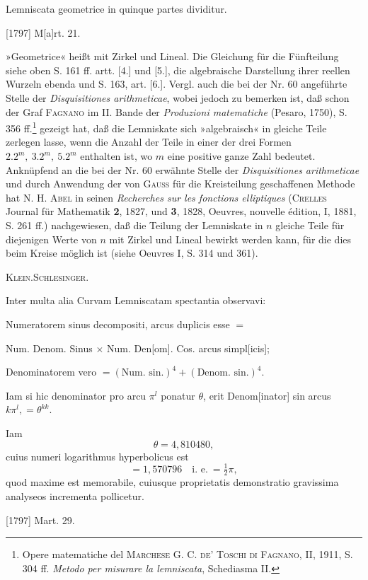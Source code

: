 \clearpage{}
\indent Lemniscata geometrice in quinque partes dividitur.
\par\noindent\hfill[1797] M[a]rt. 21.

\medskip\begingroup\small
\indent »Geometrice« heißt mit Zirkel und Lineal. Die Gleichung für die Fünfteilung siehe oben S. 161 ff. artt. [4.] und [5.], die algebraische Darstellung ihrer reellen Wurzeln ebenda und S. 163, art. [6.]. Vergl. auch die bei der Nr. 60 angeführte Stelle der \textit{Disquisitiones arithmeticae}, wobei jedoch zu bemerken ist, daß schon der Graf \textsc{Fagnano} im II. Bande der \textit{Produzioni matematiche} (Pesaro, 1750), S. 356 ff.\footnote{Opere matematiche del \textsc{Marchese G. C. de’ Toschi di Fagnano}, II, 1911, S. 304 ff. \textit{Metodo per misurare la lemniscata}, Schediasma II.} gezeigt hat, daß die Lemniskate sich »algebraisch« in gleiche Teile zerlegen lasse, wenn die Anzahl der Teile in einer der drei Formen \(2.2^m,\ 3.2^m,\ 5.2^m\) enthalten ist, wo \(m\) eine positive ganze Zahl bedeutet. Anknüpfend an die bei der Nr. 60 erwähnte Stelle der \textit{Disquisitiones arithmeticae} und durch Anwendung der von \textsc{Gauss} für die Kreisteilung geschaffenen Methode hat N. H. \textsc{Abel} in seinen \textit{Recherches sur les fonctions elliptiques} (\textsc{Crelles} Journal für Mathematik \textbf{2}, 1827, und \textbf{3}, 1828, Oeuvres, nouvelle édition, I, 1881, S. 261 ff.) nachgewiesen, daß die Teilung der Lemniskate in \(n\) gleiche Teile für diejenigen Werte von \(n\) mit Zirkel und Lineal bewirkt werden kann, für die dies beim Kreise möglich ist (siehe Oeuvres I, S. 314 und 361).
\par\noindent\hfill\textsc{Klein.\quad Schlesinger.}
\par\endgroup

\indent Inter multa alia Curvam Lemniscatam spectantia observavi:
\par\indent [1)] Numeratorem sinus decompositi, arcus duplicis esse \(=\)
\par{} Num. Denom. Sinus \(\times\) Num. Den[om]. Cos. arcus simpl[icis];
\par\indent [2)] Denominatorem vero \(=(\text{Num. sin.})^4+(\text{Denom. sin.})^4\).
\par\indent [3)] Iam si hic denominator pro arcu \(\pi^l\) ponatur \(\theta\), erit Denom[inator] sin arcus \(k\pi^l,=\theta^{kk}\).
\par\indent [4)] Iam
\[
\theta=4{,}810480,
\]
\indent [5)] cuius numeri logarithmus hyperbolicus est
\[
=1{,}570796\quad\text{i. e.}\ =\tfrac12\pi,
\]
\noindent quod maxime est memorabile, cuiusque proprietatis demonstratio gravissima analyseos incrementa pollicetur.
\par\noindent\hfill[1797] Mart. 29.

